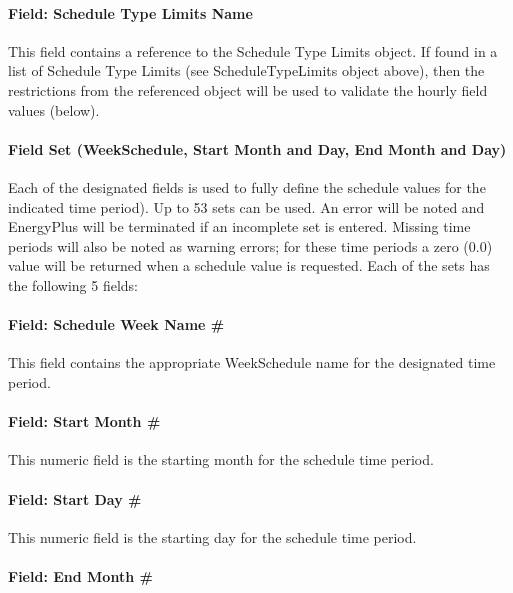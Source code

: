 \paragraph{Field: Schedule Type Limits Name}\label{field-schedule-type-limits-name-3}

This field contains a reference to the Schedule Type Limits object. If found in a list of Schedule Type Limits (see ScheduleTypeLimits object above), then the restrictions from the referenced object will be used to validate the hourly field values (below).

\paragraph{Field Set (WeekSchedule, Start Month and Day, End Month and Day)}\label{field-set-weekschedule-start-month-and-day-end-month-and-day}

Each of the designated fields is used to fully define the schedule values for the indicated time period). Up to 53 sets can be used. An error will be noted and EnergyPlus will be terminated if an incomplete set is entered. Missing time periods will also be noted as warning errors; for these time periods a zero (0.0) value will be returned when a schedule value is requested. Each of the sets has the following 5 fields:

\paragraph{Field: Schedule Week Name \#}\label{field-schedule-week-name}

This field contains the appropriate WeekSchedule name for the designated time period.

\paragraph{Field: Start Month \#}\label{field-start-month}

This numeric field is the starting month for the schedule time period.

\paragraph{Field: Start Day \#}\label{field-start-day}

This numeric field is the starting day for the schedule time period.

\paragraph{Field: End Month \#}\label{field-end-month-000}

